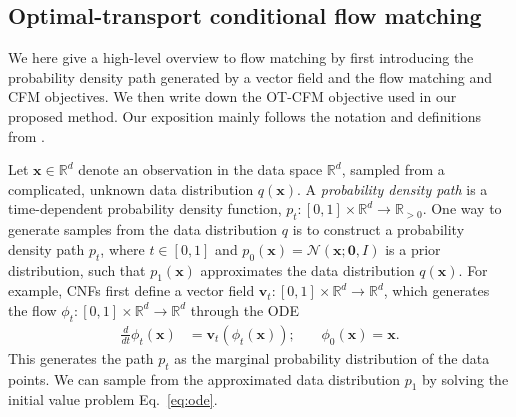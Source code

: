 \documentclass[british]{article}
\newcommand{\real}{\mathbb{R}}
\newcommand{\x}{\boldsymbol{x}}
\begin{document}
\subsection{Optimal-transport conditional flow matching}
\label{ssec:cfm}
We here give a high-level overview to flow matching by first introducing the probability density path generated by a vector field and the flow matching and CFM objectives.
We then write down the OT-CFM objective used in our proposed method.
Our exposition mainly follows the notation and definitions from \cite{lipman2023flow}.

Let 
$\x \in \real^d$ denote an observation in the data space $\real^d$, sampled from a complicated, unknown data distribution $q(\x)$. 
A \emph{probability density path} is a time-dependent probability density function, $p_t: [0,1]\times \real^d \rightarrow \real_{>0}$.
One way to generate samples from the data distribution $q$ is to construct a probability density path $p_t$, where $t \in [0,1]$ and $p_0(\x) = \mathcal{N}(\x; \boldsymbol{0},I)$ is a prior distribution, such that $p_1(\x)$ approximates the data distribution $q(\x)$.
For example, CNFs first define a vector field $\boldsymbol{v}_t: [0, 1] \times \real^d \rightarrow \real^d$, which generates the flow $\phi_t: [0, 1] \times \real^d \rightarrow \real^d$ through the ODE 
\begin{align}
\frac{d}{dt}\phi_t(\x)
& = \boldsymbol{v}_t(\phi_t(\x))
\text{;}
\qquad
\phi_0(\x)
= \x
\text{.}
\label{eq:ode}
\end{align}
This generates the path $p_t$ as the marginal probability distribution of the data points.
We can sample from the approximated data distribution $p_1$ by solving the initial value problem Eq.\ \eqref{eq:ode}. 
\end{document}
